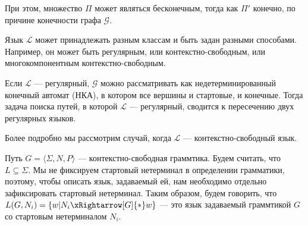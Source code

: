 При этом, множество $\Pi$ может являться бесконечным, тогда как $\Pi'$ конечно, по причине конечности графа $\mathcal{G}$.

Язык $\mathcal{L}$ может принадлежать разным классам и быть задан разными способами. Например, он может быть регулярным, или контекстно-свободным, или многокомпонентным контекстно-свободным.

Если $\mathcal{L}$ --- регулярный, $\mathcal{G}$ можно рассматривать как недетерминированный конечный автомат (НКА), в котором все вершины и стартовые, и конечные.
Тогда задача поиска путей, в которой $\mathcal{L}$ --- регулярный, сводится к пересечению двух регулярных языков.

Более подробно мы рассмотрим случай, когда $\mathcal{L}$ --- контекстно-свободный язык.

Путь $G = \langle \Sigma, N, P \rangle$ --- контекстно-свободная граммтика.
Будем считать, что $L \subseteq \Sigma$.
Мы не фиксируем стартовый нетерминал в определении грамматики, поэтому, чтобы описать язык, задаваемый ей, нам необходимо отдельно зафиксировать стартовый нетерминал.
Таким образом, будем говорить, что $L(G,N_i) = \{ w | N_i \xRightarrow[G]{*} w  \}$ --- это язык задаваемый граммтикой $G$ со стартовым нетерминалом $N_i$.


